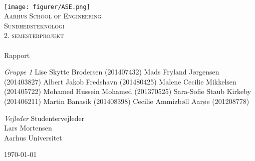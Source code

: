 \begin{titlingpage}
\begin{center}

~ \\[3cm]

\texttt{[image: figurer/ASE.png]}~\\[1cm]

\textsc{\LARGE Aarhus School of Engineering}\\[1.5cm]

\textsc{\Large Sundhedsteknologi}\\
\textsc{\Large 2. semesterprojekt}\\[0.5cm]

\noindent\makebox[\linewidth]{\rule{\textwidth}{0.4pt}}\\
[0.5cm]{\Huge Rapport}
\noindent\makebox[\linewidth]{\rule{\textwidth}{0.4pt}}

\end{center}

\textit{Gruppe 1} \newline
Lise Skytte Brodersen (201407432) \newline
Mads Fryland J\o rgensen (201403827) \newline
Albert Jakob Fredshavn (201480425) \newline
Malene Cecilie Mikkelsen (201405722) \newline		 
Mohamed Hussein Mohamed (201370525) \newline 
Sara-Sofie Staub Kirkeby (201406211) \newline
Martin Banasik (201408398) \newline
Cecilie Ammizb\o ll Aar\o e (201208778) \newline 


\textit{Vejleder} \newline
Studentervejleder\\
Lars Mortensen\\
Aarhus Universitet


\vfill

\begin{center}
{\large \today}
\end{center}


\end{titlingpage}